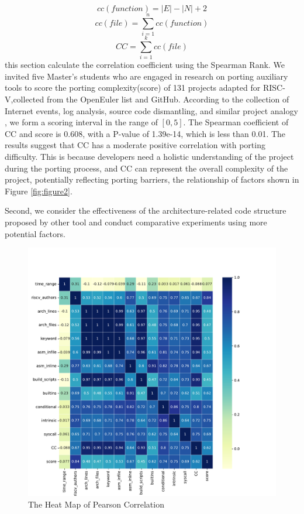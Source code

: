 \documentclass[sigconf,screen,review,anonymous]{acmart}
\begin{document}
  \begin{equation}
    {cc}({function}) = \lvert E \rvert - \lvert N \rvert + 2
    \end{equation}
    \begin{equation}
      {cc}({file}) =  \sum_{i=1}^{n} 
      {cc}({function})
      \end{equation}
      \begin{equation}
        {CC} =  \sum_{i=1}^{k} {cc}({file})
        \end{equation}
this section calculate the correlation coefficient using the Spearman Rank.
We invited five Master's students who are engaged in research on porting auxiliary tools to score the porting complexity(score) of 131 projects adapted for RISC-V,collected from the OpenEuler list\citep{stage2023} and GitHub.
According to the collection of Internet events, log analysis, source code dismantling, and similar project analogy \cite{liangguanyu2020}, we form a scoring interval in the range of $[0,5]$.
The Spearman coefficient of CC and score is 0.608, with a P-value of 1.39e-14, which is less than 0.01.
The results suggest that CC has a moderate positive correlation with porting difficulty.
This is because developers need a holistic understanding of the project during the porting process, and CC can represent the overall complexity of the project, potentially reflecting porting barriers, the relationship of factors shown in Figure \ref{fig:figure2}.




Second, we consider the effectiveness of the architecture-related code structure proposed by other tool and conduct comparative experiments using more potential factors.
\begin{figure}
  \centering
  \includegraphics[width=\linewidth]{figure3.pdf}
  \caption{The Heat Map of Pearson Correlation}
  \label{fig:figure3}
\end{figure}
\end{document}
